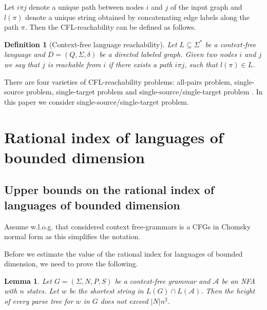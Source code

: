 \documentclass[11pt,a4paper]{article} %
\newtheorem{lemma}{Lemma}
\newtheorem{definition}{Definition}
\begin{document}
Let $i\pi j$ denote a unique path between nodes $i$ and $j$ of the input graph and $l(\pi)$ denote a unique string obtained by concatenating edge labels along the path $\pi$. Then the CFL-reachability can be defined as follows.
\begin{definition}[Context-free language reachability]
Let $L \subseteq \Sigma^*$ be a context-free language and $D = (Q, \Sigma, \delta)$ be a directed labeled graph. Given two nodes $i$ and $j$ we say that $j$ is \textit{reachable} from $i$ if there exists a path $i \pi j$, such that $l(\pi) \in L$. 
\end{definition}
There are four varieties of CFL-reachability problems: all-pairs problem, single-source problem, single-target problem and single-source/single-target problem \cite{RepsBasic}. In this paper we consider single-source/single-target problem. 



\section{Rational index of languages of bounded dimension}
\label{sec:osc}
\subsection{Upper bounds on the rational index of languages of bounded dimension}
Assume w.l.o.g. that considered context free-grammars is a CFGs in Chomsky normal form as this simplifies the notation. 


Before we estimate the value of the rational index for languages of bounded dimension, we need to prove the following.
\begin{lemma}
\label{lem:treeheight}
Let  $G = (\Sigma, N, P, S)$ be a context-free grammar and $\mathcal{A}$ be an NFA with $n$ states. Let $w$ be the shortest string in $L(G)\cap L(\mathcal{A})$. Then the height of every parse tree for $w$ in $G$ does not exceed $|N|n^2$.
\end{lemma}
\end{document}
